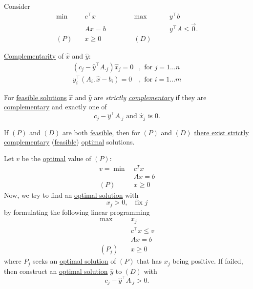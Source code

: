 \begin{eg}
	Consider
	\[
		\begin{alignedat}{5}
			\min~&c^{\top}x\qquad\qquad&&\max ~&&y^{\top}b\\
			&Ax = b 				&&		&&y^{\top}A\leq \vec{0}.\\
			(P)\quad	&x\geq  0 	&&(D)\quad&&
		\end{alignedat}
	\]
	\begin{prev}
		\hyperref[def:complementary]{Complementarity} of \(\hat{x}\) and \(\hat{y}\)\(\colon\)
		\[
			\begin{split}
				(c_{j} - \hat{y}^{\top} A_{\cdot j}) \hat{x}_j = 0&, \text{ for }j = 1\ldots n\\
				y^{\top}_i (A_{i\cdot}\hat{x} - b_{i}) = 0&, \text{ for } i = 1\ldots m
			\end{split}
		\]
	\end{prev}

	\begin{definition}
		For \hyperref[def:feasible-solution]{feasible solutions} \(\hat{x}\) and \(\hat{y}\) are \emph{strictly \hyperref[def:complementary]{complementary}} if
		they are \hyperref[def:complementary]{complementary} and exactly one of
		\[
			c_{j} - \hat{y}^{\top}A_{\cdot j}\text{ and }\hat{x}_j \text{ is } 0.
		\]
	\end{definition}

	\begin{theorem}\label{thm:strictly-complementarity}
		If \((P)\) and \((D)\) are both \hyperref[def:feasible-solution]{feasible}, then for \((P)\) and \((D)\) \underline{there exist strictly}
		\hyperref[def:complementary]{complementary} (\hyperref[def:feasible-solution]{feasible}) \hyperref[def:optimal-solution]{optimal} solutions.
	\end{theorem}

	\begin{intuition}
		Let \(v\) be the \hyperref[def:optimal-solution]{optimal} value of \((P)\)\(\colon\)
		\begin{align*}
			v = \min~ & c^Tx    \\
			          & Ax = b  \\
			(P)\quad  & x\geq 0
		\end{align*}
		Now, we try to find an \hyperref[def:optimal-solution]{optimal solution} with
		\[
			x_{j}>0, \quad \text{fix }j
		\]
		by formulating the following linear programming
		\begin{align*}
			\max~      & x_{j}           \\
			           & c^{\top}x\leq v \\
			           & Ax = b          \\
			(P_j)\quad & x\geq  0
		\end{align*}
		where \(P_{j}\) seeks an \hyperref[def:optimal-solution]{optimal solution} of \((P)\) that has \(x_{j}\) being positive.
		If failed, then construct an \hyperref[def:optimal-solution]{optimal solution} \(\hat{y}\) to \((D)\) with
		\[
			c_{j} - \hat{y}^{\top} A_{\cdot j}>0.
		\]


\end{intuition}
\end{eg}
